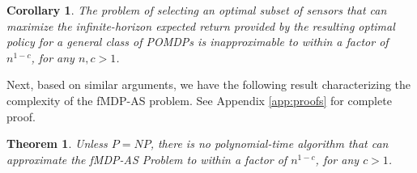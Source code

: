 \documentclass[twocolumn]{autart}    %
\newtheorem{theorem}{Theorem}
\newtheorem{corollary}{Corollary}
\begin{document}
 
 \begin{corollary}
     The problem of selecting an optimal subset of sensors that can maximize the infinite-horizon expected return provided by the resulting optimal policy for a general class of POMDPs is inapproximable to within a factor of $n^{1-c}$, for any $n, c>1$.
 \end{corollary}

Next, based on similar arguments, we have the following result characterizing the complexity of the fMDP-AS problem. {See Appendix \ref{app:proofs} for complete proof.}\\

\begin{theorem} \label{thm2} Unless $P=NP$, there is no polynomial-time algorithm that can approximate the fMDP-AS Problem to within a factor of $n^{1-c}$, for any $c > 1$.
\end{theorem}



\end{document}
